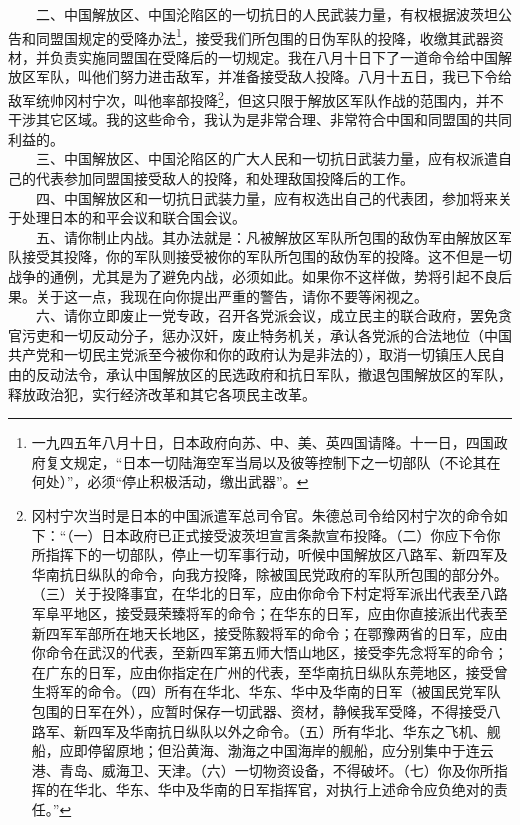 \documentclass[cn,11pt,chinese]{elegantbook}
\begin{document}
　　二、中国解放区、中国沦陷区的一切抗日的人民武装力量，有权根据波茨坦公告和同盟国规定的受降办法\footnote[5]{ 一九四五年八月十日，日本政府向苏、中、美、英四国请降。十一日，四国政府复文规定，“日本一切陆海空军当局以及彼等控制下之一切部队（不论其在何处）”，必须“停止积极活动，缴出武器”。}，接受我们所包围的日伪军队的投降，收缴其武器资材，并负责实施同盟国在受降后的一切规定。我在八月十日下了一道命令给中国解放区军队，叫他们努力进击敌军，并准备接受敌人投降。八月十五日，我已下令给敌军统帅冈村宁次，叫他率部投降\footnote[6]{ 冈村宁次当时是日本的中国派遣军总司令官。朱德总司令给冈村宁次的命令如下：“（一）日本政府已正式接受波茨坦宣言条款宣布投降。（二）你应下令你所指挥下的一切部队，停止一切军事行动，听候中国解放区八路军、新四军及华南抗日纵队的命令，向我方投降，除被国民党政府的军队所包围的部分外。（三）关于投降事宜，在华北的日军，应由你命令下村定将军派出代表至八路军阜平地区，接受聂荣臻将军的命令；在华东的日军，应由你直接派出代表至新四军军部所在地天长地区，接受陈毅将军的命令；在鄂豫两省的日军，应由你命令在武汉的代表，至新四军第五师大悟山地区，接受李先念将军的命令；在广东的日军，应由你指定在广州的代表，至华南抗日纵队东莞地区，接受曾生将军的命令。（四）所有在华北、华东、华中及华南的日军（被国民党军队包围的日军在外），应暂时保存一切武器、资材，静候我军受降，不得接受八路军、新四军及华南抗日纵队以外之命令。（五）所有华北、华东之飞机、舰船，应即停留原地；但沿黄海、渤海之中国海岸的舰船，应分别集中于连云港、青岛、威海卫、天津。（六）一切物资设备，不得破坏。（七）你及你所指挥的在华北、华东、华中及华南的日军指挥官，对执行上述命令应负绝对的责任。”}，但这只限于解放区军队作战的范围内，并不干涉其它区域。我的这些命令，我认为是非常合理、非常符合中国和同盟国的共同利益的。\\
　　三、中国解放区、中国沦陷区的广大人民和一切抗日武装力量，应有权派遣自己的代表参加同盟国接受敌人的投降，和处理敌国投降后的工作。\\
　　四、中国解放区和一切抗日武装力量，应有权选出自己的代表团，参加将来关于处理日本的和平会议和联合国会议。\\
　　五、请你制止内战。其办法就是：凡被解放区军队所包围的敌伪军由解放区军队接受其投降，你的军队则接受被你的军队所包围的敌伪军的投降。这不但是一切战争的通例，尤其是为了避免内战，必须如此。如果你不这样做，势将引起不良后果。关于这一点，我现在向你提出严重的警告，请你不要等闲视之。\\
　　六、请你立即废止一党专政，召开各党派会议，成立民主的联合政府，罢免贪官污吏和一切反动分子，惩办汉奸，废止特务机关，承认各党派的合法地位（中国共产党和一切民主党派至今被你和你的政府认为是非法的），取消一切镇压人民自由的反动法令，承认中国解放区的民选政府和抗日军队，撤退包围解放区的军队，释放政治犯，实行经济改革和其它各项民主改革。\\
\end{document}
